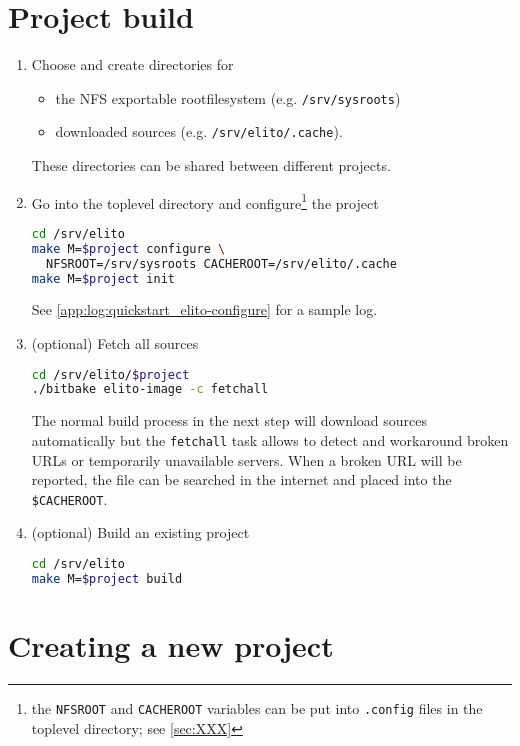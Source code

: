\section{Project build}
\label{subsec:quickstart_project-build}

\begin{enumerate}[resume]
\item Choose and create directories for
  \begin{itemize}
  \item the NFS exportable rootfilesystem (e.g. \texttt{/srv/sysroots})
  \item downloaded sources (e.g. \texttt{/srv/elito/.cache}).
  \end{itemize}

  These directories can be shared between different projects.

\item Go into the toplevel directory and configure\footnote{the
    \texttt{NFSROOT} and \texttt{CACHEROOT} variables can be put into
    \texttt{.config} files in the toplevel directory; see
    \autoref{sec:XXX}} the project %
\begin{lstlisting}[language=bash]
cd /srv/elito
make M=$project configure \
  NFSROOT=/srv/sysroots CACHEROOT=/srv/elito/.cache
make M=$project init
\end{lstlisting}

  See \autoref{app:log:quickstart_elito-configure} for a sample log.

\item (optional) Fetch all sources
\begin{lstlisting}[language=bash]
cd /srv/elito/$project
./bitbake elito-image -c fetchall
\end{lstlisting}%

  The normal build process in the next step will download sources
  automatically but the \texttt{fetchall} task allows to detect and
  workaround broken URLs or temporarily unavailable servers.  When a
  broken URL will be reported, the file can be searched in the
  internet and placed into the \texttt{\$CACHEROOT}.
\item (optional) Build an existing project
\begin{lstlisting}[language=bash]
cd /srv/elito
make M=$project build
\end{lstlisting}%

\end{enumerate}

\section{Creating a new project}
\label{sec:quickstart_new-project}


